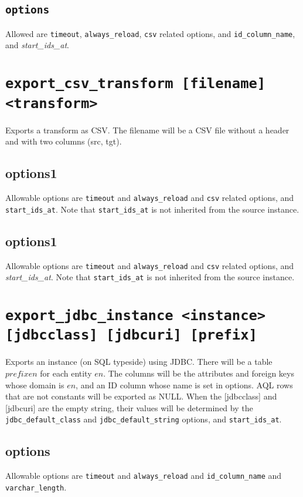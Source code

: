 \documentclass[10pt]{book}
\begin{document}
\subsection{{\tt options}}
Allowed are {\tt timeout}, {\tt always\_reload}, {\tt csv} related options, and {\tt id\_column\_name}, and {\it start\_ids\_at}.

\section{{\tt export\_csv\_transform [filename] <transform>}}

Exports a transform as CSV.  The filename will be a CSV file without a header and with two columns (src, tgt).  

\subsection{options1}
Allowable options are {\tt timeout} and {\tt always\_reload}  and {\tt csv} related options, and {\tt start\_ids\_at}.  Note that {\tt start\_ids\_at} is not inherited from the source instance.

\subsection{options1}
Allowable options are {\tt timeout} and {\tt always\_reload}  and {\tt csv} related options, and {\it start\_ids\_at}.  Note that {\tt start\_ids\_at} is not inherited from the source instance.

\section{{\tt export\_jdbc\_instance <instance> [jdbcclass] [jdbcuri] [prefix] }}

Exports an instance (on SQL typeside) using JDBC.  There will be a table $prefixen$ for each entity $en$.  The columns will be the attributes and foreign keys whose domain is $en$, and an ID column whose name is set in options.  AQL rows that are not constants will be exported as NULL.  When the [jdbcclass] and [jdbcuri] are the empty string, their values will be determined by the {\tt jdbc\_default\_class} and {\tt jdbc\_default\_string} options, and {\tt start\_ids\_at}.

\subsection{options}
Allowable options are {\tt timeout}  and {\tt always\_reload} and  {\tt id\_column\_name} and {\tt varchar\_length}.
\end{document}
